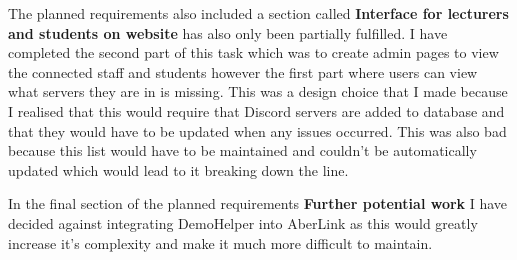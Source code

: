 The planned requirements also included a section called \textbf{Interface for lecturers and students on website} has also only been partially fulfilled. I have completed the second part of this task which was to create admin pages to view the connected staff and students however the first part where users can view what servers they are in is missing. This was a design choice that I made because I realised that this would require that Discord servers are added to database and that they would have to be updated when any issues occurred. This was also bad because this list would have to be maintained and couldn't be automatically updated which would lead to it breaking down the line.

In the final section of the planned requirements \textbf{Further potential work} I have decided against integrating DemoHelper into AberLink as this would greatly increase it's complexity and make it much more difficult to maintain.